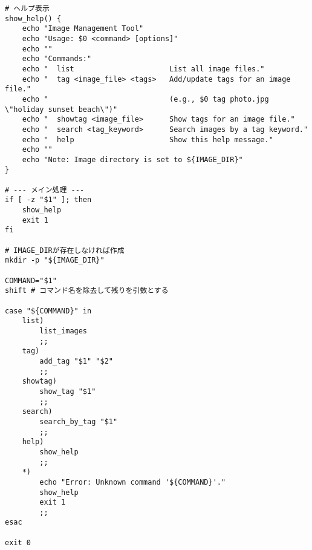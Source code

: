 \documentclass[a4paper,11pt]{jsarticle}
\begin{document}
\begin{lstlisting}[caption=演習17 画像管理スクリプト `imgtool.sh`]
# ヘルプ表示
show_help() {
    echo "Image Management Tool"
    echo "Usage: $0 <command> [options]"
    echo ""
    echo "Commands:"
    echo "  list                      List all image files."
    echo "  tag <image_file> <tags>   Add/update tags for an image file."
    echo "                            (e.g., $0 tag photo.jpg \"holiday sunset beach\")"
    echo "  showtag <image_file>      Show tags for an image file."
    echo "  search <tag_keyword>      Search images by a tag keyword."
    echo "  help                      Show this help message."
    echo ""
    echo "Note: Image directory is set to ${IMAGE_DIR}"
}

# --- メイン処理 ---
if [ -z "$1" ]; then
    show_help
    exit 1
fi

# IMAGE_DIRが存在しなければ作成
mkdir -p "${IMAGE_DIR}"

COMMAND="$1"
shift # コマンド名を除去して残りを引数とする

case "${COMMAND}" in
    list)
        list_images
        ;;
    tag)
        add_tag "$1" "$2"
        ;;
    showtag)
        show_tag "$1"
        ;;
    search)
        search_by_tag "$1"
        ;;
    help)
        show_help
        ;;
    *)
        echo "Error: Unknown command '${COMMAND}'."
        show_help
        exit 1
        ;;
esac

exit 0
\end{lstlisting}
\end{document}
